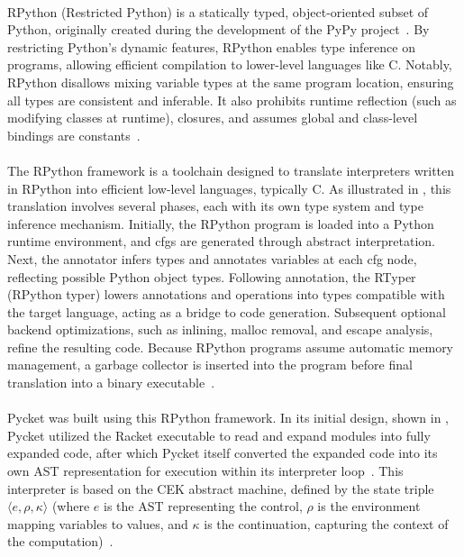         \paragraph{}%
            RPython (Restricted Python) is a statically typed, object-oriented subset of Python, originally created during the development of the PyPy project~\cite{pypy06}. By restricting Python’s dynamic features, RPython enables type inference on programs, allowing efficient compilation to lower-level languages like C. Notably, RPython disallows mixing variable types at the same program location, ensuring all types are consistent and inferable. It also prohibits runtime reflection (such as modifying classes at runtime), closures, and assumes global and class-level bindings are constants~\cite{rpython07,rpython09}.


        \paragraph{}%
            The RPython framework is a toolchain designed to translate interpreters written in RPython into efficient low-level languages, typically C. As illustrated in , this translation involves several phases, each with its own type system and type inference mechanism. Initially, the RPython program is loaded into a Python runtime environment, and \glspl{cfg} are generated through abstract interpretation. Next, the annotator infers types and annotates variables at each \gls{cfg} node, reflecting possible Python object types. Following annotation, the RTyper (RPython typer) lowers annotations and operations into types compatible with the target language, acting as a bridge to code generation. Subsequent optional backend optimizations, such as inlining, malloc removal, and escape analysis, refine the resulting code. Because RPython programs assume automatic memory management, a garbage collector is inserted into the program before final translation into a binary executable~\cite{rpython07,pypy06,pypy08}.

        \paragraph{}%
            Pycket was built using this RPython framework. In its initial design, shown in , Pycket utilized the Racket executable to read and expand modules into fully expanded code, after which Pycket itself converted the expanded code into its own AST representation for execution within its interpreter loop~\cite{samth:11,bolzMetatracingMakesFast2014,pycketmain}. This interpreter is based on the CEK abstract machine, defined by the state triple $\langle e,\rho,\kappa\rangle$ (where $e$ is the AST representing the control, $\rho$ is the environment mapping variables to values, and $\kappa$ is the continuation, capturing the context of the computation)~\cite{felleisen87}.

